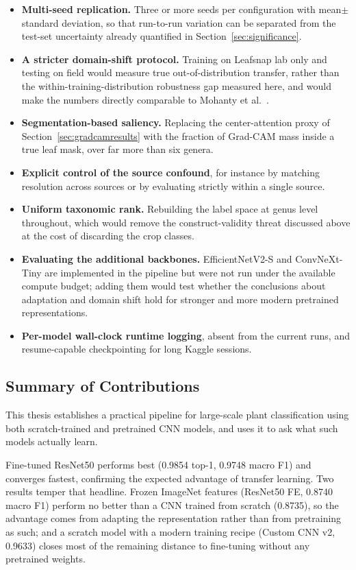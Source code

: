 \documentclass[12pt,a4paper]{article}
\begin{document}
\begin{itemize}
    \item \textbf{Multi-seed replication.} Three or more seeds per configuration with mean$\pm$standard deviation, so that run-to-run variation can be separated from the test-set uncertainty already quantified in Section~\ref{sec:significance}.
    \item \textbf{A stricter domain-shift protocol.} Training on Leafsnap lab only and testing on field would measure true out-of-distribution transfer, rather than the within-training-distribution robustness gap measured here, and would make the numbers directly comparable to Mohanty et al.~\cite{mohanty2016}.
    \item \textbf{Segmentation-based saliency.} Replacing the center-attention proxy of Section~\ref{sec:gradcamresults} with the fraction of Grad-CAM mass inside a true leaf mask, over far more than six genera.
    \item \textbf{Explicit control of the source confound}, for instance by matching resolution across sources or by evaluating strictly within a single source.
    \item \textbf{Uniform taxonomic rank.} Rebuilding the label space at genus level throughout, which would remove the construct-validity threat discussed above at the cost of discarding the crop classes.
    \item \textbf{Evaluating the additional backbones.} EfficientNetV2-S and ConvNeXt-Tiny are implemented in the pipeline but were not run under the available compute budget; adding them would test whether the conclusions about adaptation and domain shift hold for stronger and more modern pretrained representations.
    \item \textbf{Per-model wall-clock runtime logging}, absent from the current runs, and resume-capable checkpointing for long Kaggle sessions.
\end{itemize}

\subsection{Summary of Contributions}
This thesis establishes a practical pipeline for large-scale plant classification using both scratch-trained and pretrained CNN models, and uses it to ask what such models actually learn.

Fine-tuned ResNet50 performs best (0.9854 top-1, 0.9748 macro F1) and converges fastest, confirming the expected advantage of transfer learning. Two results temper that headline. Frozen ImageNet features (ResNet50 FE, 0.8740 macro F1) perform no better than a CNN trained from scratch (0.8735), so the advantage comes from adapting the representation rather than from pretraining as such; and a scratch model with a modern training recipe (Custom CNN v2, 0.9633) closes most of the remaining distance to fine-tuning without any pretrained weights.
\end{document}

